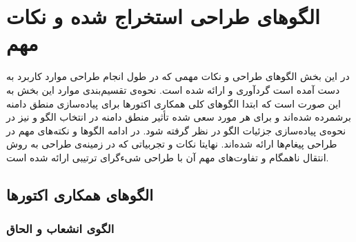 \section{الگوهای طراحی استخراج شده و نکات مهم}
در این بخش الگوهای طراحی و نکات مهمی‌ که در طول انجام طراحی موارد کاربرد به دست آمده است گردآوری و ارائه شده است. نحوه‌ی تقسیم‌بندی موارد این بخش به این صورت است که ابتدا الگوهای  کلی همکاری اکتورها برای پیاده‌سازی منطق دامنه برشمرده شده‌اند و برای هر مورد سعی شده تأثیر منطق دامنه در انتخاب الگو و نیز در نحوه‌ی پیاده‌سازی جزئیات الگو در نظر گرفته شود. در ادامه الگوها و نکته‌های مهم در طراحی پیغام‌ها ارائه شده‌اند. نهایتا نکات و تجربیاتی که در زمینه‌ی طراحی به روش انتقال ناهمگام و تفاوت‌های مهم آن با طراحی شیءگرای ترتیبی ارائه شده است.
\subsection{الگوهای همکاری اکتورها}
\subsubsection{الگوی انشعاب و الحاق}

